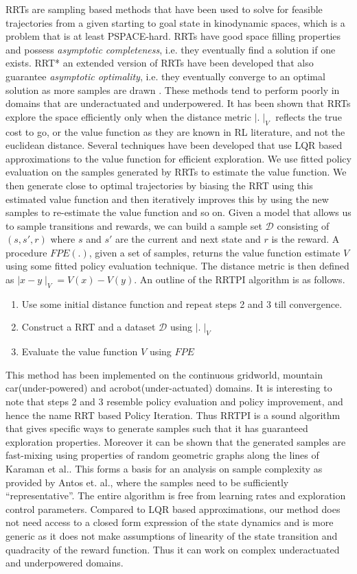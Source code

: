 \documentclass[12pt,a4paper]{article}
\begin{document}
RRTs are sampling based methods that have been used to solve for feasible trajectories from a given starting to goal state in kinodynamic spaces, which is a problem that is at least PSPACE-hard. RRTs have good space filling properties and possess \emph{asymptotic completeness}, i.e. they eventually find a solution if one exists. RRT* an extended version of RRTs have been developed that also guarantee \emph{asymptotic optimality}, i.e. they eventually converge to an optimal solution as more samples are drawn \cite{karaman}. These methods tend to perform poorly in domains that are underactuated and underpowered. It has been shown that RRTs explore the space efficiently only when the distance metric $\mid . \mid_{V}$ reflects the true cost to go\cite{chengrrt}, or the value function as they are known in RL literature, and not the euclidean distance. Several techniques have been developed that use LQR based approximations to the value function for efficient exploration. We use fitted policy evaluation on the samples generated by RRTs to estimate the value function. We then generate close to optimal trajectories by biasing the RRT using this estimated value function and then iteratively improves this by using the new samples to re-estimate the value function and so on. Given a model that allows us to sample transitions and rewards, we can build a sample set $\mathcal{D}$ consisting of $(s,s',r)$ where $s$ and $s'$ are the current and next state and $r$ is the reward. A procedure $\textit{FPE}(.)$, given a set of samples, returns the value function estimate $V$ using some fitted policy evaluation technique. The distance metric is then defined as $\mid x - y \mid_{V} =V(x)-V(y)$. An outline of the RRTPI algorithm is as follows.
\begin{enumerate}
\item Use some initial distance function and repeat steps 2 and 3 till convergence.
\item Construct a RRT and a dataset $\mathcal{D}$ using $\mid . \mid_{V}$
\item Evaluate the value function $V$ using $\textit{FPE}$
\end{enumerate}
This method has been implemented on the continuous gridworld, mountain car(under-powered) and acrobot(under-actuated) domains. It is interesting to note that steps 2 and 3 resemble policy evaluation and policy improvement, and hence the name RRT based Policy Iteration. Thus RRTPI is a sound algorithm that gives specific ways to generate samples such that it has guaranteed exploration properties. Moreover it can be shown that the generated samples are fast-mixing using properties of random geometric graphs along the lines of Karaman et al.\cite{karaman}. This forms a basis for an analysis on sample complexity as provided by Antos et. al.\cite{antosml}, where the samples need to be sufficiently ``representative''. The entire algorithm is free from learning rates and exploration control parameters. Compared to LQR based approximations, our method does not need access to a closed form expression of the state dynamics and is more generic as it does not make assumptions of linearity of the state transition and quadracity of the reward function. Thus it can work on complex underactuated and underpowered domains.


\end{document}
